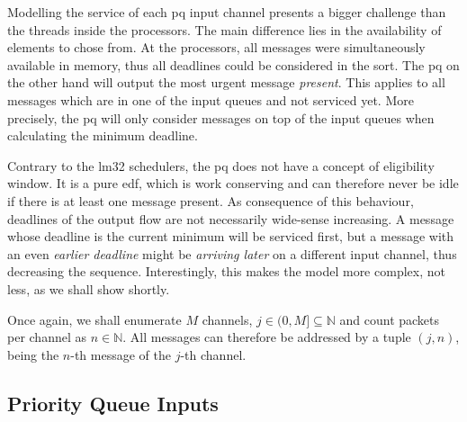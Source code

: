 Modelling the service of each \gls{pq} input channel presents a bigger challenge than the threads inside the processors. The main difference lies in the availability of elements to chose from.
At the processors, all messages were simultaneously available in memory, thus all deadlines could be considered in the sort. 
The \gls{pq} on the other hand will output the most urgent message \emph{present}. This applies to all messages which are in one of the input queues and not serviced yet.
More precisely, the \gls{pq} will only consider messages on top of the input queues when calculating the minimum deadline.
\par
Contrary to the \gls{lm32} schedulers, the \gls{pq} does not have a concept of eligibility window. It is a pure \gls{edf}, which is work conserving and can therefore never be idle if there is at least one message present.
As consequence of this behaviour, deadlines of the output flow are not necessarily wide-sense increasing. A message whose deadline is the current minimum will be serviced first,
but a message with an even \emph{earlier deadline} might be \emph{arriving later} on a different input channel, thus decreasing the sequence. 
Interestingly, this makes the model more complex, not less, as we shall show shortly.
\par
Once again, we shall enumerate $M$ channels, $j \in (0,M] \subseteq \mathbb{N}$ and count packets per channel as $n \in \mathbb{N}$.
All messages can therefore be addressed by a tuple $(j,n)$, being the $n$-th message of the $j$-th channel.
 
\subsection{Priority Queue Inputs}

